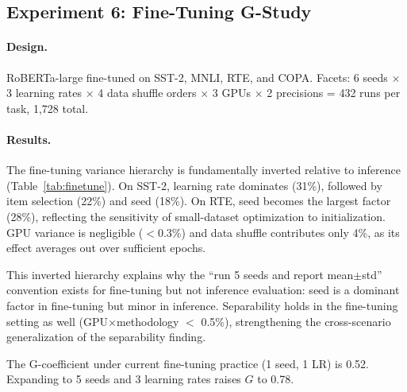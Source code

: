 \documentclass[11pt]{article}
\newcommand{\gcoeff}{G}
\begin{document}
\subsection{Experiment 6: Fine-Tuning G-Study}
\label{sec:exp6}

\paragraph{Design.}
RoBERTa-large fine-tuned on SST-2, MNLI, RTE, and COPA.
Facets: 6 seeds $\times$ 3 learning rates $\times$ 4 data shuffle orders $\times$ 3 GPUs $\times$ 2 precisions = 432 runs per task, 1,728 total.

\paragraph{Results.}
The fine-tuning variance hierarchy is fundamentally inverted relative to inference (Table~\ref{tab:finetune}).
On SST-2, learning rate dominates (31\%), followed by item selection (22\%) and seed (18\%).
On RTE, seed becomes the largest factor (28\%), reflecting the sensitivity of small-dataset optimization to initialization.
GPU variance is negligible ($<$0.3\%) and data shuffle contributes only 4\%, as its effect averages out over sufficient epochs.

This inverted hierarchy explains why the ``run 5 seeds and report mean$\pm$std'' convention exists for fine-tuning but not inference evaluation: seed is a dominant factor in fine-tuning but minor in inference.
Separability holds in the fine-tuning setting as well (GPU$\times$methodology $<$ 0.5\%), strengthening the cross-scenario generalization of the separability finding.

The G-coefficient under current fine-tuning practice (1 seed, 1 LR) is 0.52.
Expanding to 5 seeds and 3 learning rates raises $\gcoeff$ to 0.78.
\end{document}

